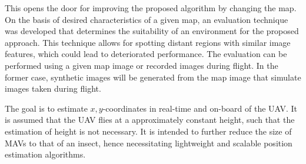 This opens the door for improving the proposed
algorithm by changing the map. On the basis of desired characteristics
of a given map, an evaluation technique was developed that determines
the suitability of an environment for the proposed approach. This
technique allows for spotting distant regions with similar image
features, which could lead to deteriorated performance. The evaluation
can be performed using a given map image or recorded images during
flight. In the former case, synthetic images will be generated from
the map image that simulate images taken during flight.

The goal is to estimate $x,y$-coordinates in real-time and on-board of the UAV. It is assumed that the UAV flies at a approximately constant height, such that the estimation of height is not necessary.  It is intended to further reduce the size of MAVs to that of an
insect, hence necessitating lightweight and scalable position
estimation algorithms.